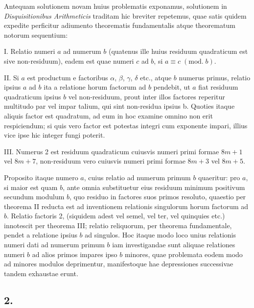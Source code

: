 \documentclass[twoside,12pt]{memoir}
\renewcommand{\pmod}[1]{\;(\textrm{mod.}\;#1)}
\begin{document}
Antequam solutionem novam huius problematis exponamus, solutionem in \textit{Disquisitionibus Arithmeticis} traditam hic breviter repetemus, quae satis quidem expedite perficitur adiumento theorematis fundamentalis atque theorematum notorum sequentium:
 
I. Relatio numeri \(a\) ad numerum \(b\) (quatenus ille huius residuum quadraticum est sive non-residuum), eadem est quae numeri \(c\) ad \(b\), si \(a \equiv c\pmod{b}\).
 
II. Si \(a\) est productum e factoribus \(\alpha\), \(\beta\), \(\gamma\), \(\delta\) etc., atque \(b\) numerus primus, relatio ipsius \(a\) ad \(b\) ita a relatione horum factorum ad \(b\) pendebit, ut \(a\) fiat residuum quadraticum ipsius \(b\) vel non-residuum, prout inter illos factores reperitur multitudo par vel impar talium, qui sint non-residua ipsius b. Quoties itaque aliquis factor est quadratum, ad eum in hoc examine omnino non erit respiciendum; si quis vero factor est potestas integri cum exponente impari, illius vice ipse hic integer fungi poterit.
 
III. Numerus 2 est residuum quadraticum cuiusvis numeri primi formae \(8 m+1\) vel \(8 m+7\), non-residuum vero cuiusvis numeri primi formae \(8 m+3\) vel \(8 m+5\).\pagebreak%
 
Proposito itaque numero \(a\), cuius relatio ad numerum primum \(b\) quaeritur: pro \(a\), si maior est quam \(b\), ante omnia substituetur eius residuum minimum positivum secundum modulum \(b\), quo residuo in factores suos primos resoluto, quaestio per theorema II reducta est ad inventionem relationis singulorum horum factorum ad \(b\). Relatio factoris 2, (siquidem adest vel semel, vel ter, vel quinquies etc.) innotescit per theorema III; relatio reliquorum, per theorema fundamentale, pendet a relatione ipsius \(b\) ad singulos. Hoc itaque modo loco unius relationis numeri dati ad numerum primum \(b\) iam investigandae sunt aliquae relationes numeri \(b\) ad alios primos impares ipso \(b\) minores, quae problemata eodem modo ad minores modulos deprimentur, manifestoque hae depressiones successivae tandem exhaustae erunt.

\subsection*{2.}
 
\end{document}
